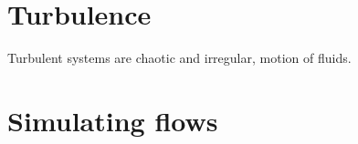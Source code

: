 \section{Turbulence}

Turbulent systems are chaotic and irregular, motion of fluids.  

\section{Simulating flows}
